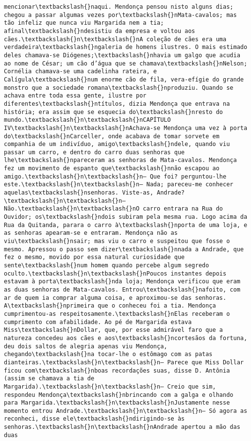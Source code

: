 \begin{Verbatim}[commandchars=\\\{\}]
mencionar\textbackslash{}naqui. Mendonça pensou nisto alguns dias; chegou a passar algumas vezes por\textbackslash{}nMata-cavalos; mas tão infeliz que nunca viu Margarida nem a tia; afinal\textbackslash{}ndesistiu da empresa e voltou aos cães.\textbackslash{}n\textbackslash{}nA coleção de cães era uma verdadeira\textbackslash{}ngaleria de homens ilustres. O mais estimado deles chamava-se Diógenes;\textbackslash{}nhavia um galgo que acudia ao nome de César; um cão d’água que se chamava\textbackslash{}nNelson; Cornélia chamava-se uma cadelinha rateira, e Calígula\textbackslash{}num enorme cão de fila, vera-efígie do grande monstro que a sociedade romana\textbackslash{}nproduziu. Quando se achava entre toda essa gente, ilustre por diferentes\textbackslash{}ntítulos, dizia Mendonça que entrava na história; era assim que se esquecia do\textbackslash{}nresto do mundo.\textbackslash{}n\textbackslash{}nCAPÍTULO IV\textbackslash{}n\textbackslash{}nAchava-se Mendonça uma vez à porta do\textbackslash{}nCarceller, onde acabava de tomar sorvete em companhia de um indivíduo, amigo\textbackslash{}ndele, quando viu passar um carro, e dentro do carro duas senhoras que lhe\textbackslash{}npareceram as senhoras de Mata-cavalos. Mendonça fez um movimento de espanto que\textbackslash{}nnão escapou ao amigo.\textbackslash{}n\textbackslash{}n— Que foi? perguntou-lhe este.\textbackslash{}n\textbackslash{}n— Nada; pareceu-me conhecer aquelas\textbackslash{}nsenhoras. Viste-as, Andrade?\textbackslash{}n\textbackslash{}n— Não.\textbackslash{}n\textbackslash{}nO carro entrara na Rua do Ouvidor; os\textbackslash{}ndois subiram pela mesma rua. Logo acima da Rua da Quitanda, parara o carro à\textbackslash{}nporta de uma loja, e as senhoras apearam-se e entraram. Mendonça não as viu\textbackslash{}nsair; mas viu o carro e suspeitou que fosse o mesmo. Apressou o passo sem dizer\textbackslash{}nnada a Andrade, que fez o mesmo, movido por essa natural curiosidade que sente\textbackslash{}num homem quando percebe algum segredo oculto.\textbackslash{}n\textbackslash{}nPoucos instantes depois estavam à porta\textbackslash{}nda loja; Mendonça verificou que eram as duas senhoras de Mata-cavalos. Entrou\textbackslash{}nafoito, com ar de quem ia comprar alguma coisa, e aproximou-se das senhoras. A\textbackslash{}nprimeira que o conheceu foi a tia. Mendonça cumprimentou-as respeitosamente.\textbackslash{}nElas receberam o cumprimento com afabilidade. Ao pé de Margarida estava Miss\textbackslash{}nDollar, que, por esse admirável faro que a natureza concedeu aos cães e aos\textbackslash{}ncortesãos da fortuna, deu dois saltos de alegria apenas viu Mendonça, chegando\textbackslash{}na tocar-lhe o estômago com as patas dianteiras.\textbackslash{}n\textbackslash{}n— Parece que Miss Dollar ficou com\textbackslash{}nboas recordações suas, disse D. Antônia (assim se chamava a tia de Margarida).\textbackslash{}n\textbackslash{}n— Creio que sim, respondeu Mendonça\textbackslash{}nbrincando com a galga e olhando para Margarida.\textbackslash{}n\textbackslash{}nJustamente nesse momento entrou Andrade.\textbackslash{}n\textbackslash{}n— Só agora as reconheci, disse ele\textbackslash{}ndirigindo-se às senhoras.\textbackslash{}n\textbackslash{}nAndrade apertou a mão das duas 
\end{Verbatim}
